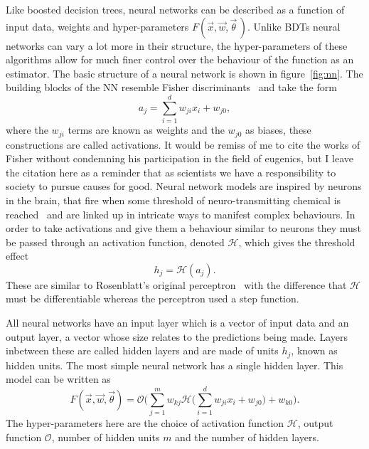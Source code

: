 Like boosted decision trees, neural networks can be described as a function of
input data, weights and hyper-parameters $F(\vec{x}, \vec{w}, \vec{\theta} \,)$.
Unlike BDTs neural networks can vary a lot more in their structure, the
hyper-parameters of these algorithms allow for much finer control over the
behaviour of the function as an estimator. The basic structure of a neural
network is shown in figure~\ref{fig:nn}.  The building blocks of the NN resemble
Fisher discriminants~\cite{Fisher} and take the form
\begin{equation}
a_j = \sum_{i=1}^{d} w_{ji}x_{i} + w_{j0},
\label{eq:fisher}
\end{equation}
where the $w_{ji}$ terms are known as weights and the $w_{j0}$ as biases, these
constructions are called activations. It would be remiss of me to cite the works
of Fisher without condemning his participation in the field of eugenics, but I
leave the citation here as a reminder that as scientists we have a
responsibility to society to pursue causes for good. Neural network models are
inspired by neurons in the brain, that fire when some threshold of
neuro-transmitting chemical is reached~\cite{neuron} and are linked up in
intricate ways to manifest complex behaviours. In order to take activations and
give them a behaviour similar to neurons they must be passed through an
activation function, denoted $\mathcal{H}$, which gives the threshold effect
\begin{equation}
h_j = \mathcal{H}(a_j).
\label{eq:hiddenunit}
\end{equation}
These are similar to Rosenblatt's original perceptron~\cite{Rosenblatt} with the
difference that $\mathcal{H}$ must be differentiable whereas the perceptron used
a step function.

All neural networks  have an input layer which is a vector of input data and an
output layer, a vector whose size relates to the predictions being made. Layers
inbetween these are called hidden layers and are made of units $h_j$, known as
hidden units. The most simple neural network has a single hidden layer. This
model can be written as
\begin{equation}
F(\vec{x},\vec{w}, \vec{\theta}) = \mathcal{O} \Bigg( \sum_{j=1}^{m} w_{kj}
\mathcal{H} \Bigg( \sum_{i=1}^{d} w_{ji} x_{i} + w_{j0} \Bigg) + w_{k0} \Bigg).
\label{eq:basicnn}
\end{equation}
 The hyper-parameters here are the choice of activation function $\mathcal{H}$,
 output function $\mathcal{O}$, number of hidden units $m$ and the number of
 hidden layers.
 
